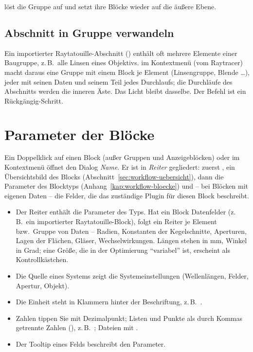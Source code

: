  löst die Gruppe auf und setzt ihre Blöcke wieder auf die äußere Ebene.

\subsection{Abschnitt in Gruppe verwandeln}

Ein importierter Raytatouille-Abschnitt () enthält oft mehrere Elemente einer
Baugruppe, z.\,B.\ alle Linsen eines Objektivs.  im Kontextmenü (vom
Raytracer) macht daraus eine Gruppe mit einem Block je Element (Linsengruppe, Blende …), jeder
mit seinen Daten und seinem Teil jedes Durchlaufs; die Durchläufe des Abschnitts werden die inneren
Äste. Das Licht bleibt dasselbe. Der Befehl ist ein Rückgängig-Schritt.

\section{Parameter der Blöcke}\label{sec:workflow-parameter}

Ein Doppelklick auf einen Block (außer Gruppen und Anzeigeblöcken) oder  im
Kontextmenü öffnet den Dialog  \textit{Name}. Er ist in \emph{Reiter}
gegliedert: zuerst , ein Übersichtsbild des Blocks
(Abschnitt~\ref{sec:workflow-uebersicht}), dann die Parameter des Blocktyps
(Anhang~\ref{kap:workflow-bloecke}) und – bei Blöcken mit eigenen Daten – die Felder, die das
zuständige Plugin für diesen Block beschreibt.

\begin{itemize}
  \item Der Reiter  enthält die Parameter des Typs. Hat ein Block Datenfelder
        (z.\,B.\ ein importierter Raytatouille-Block), folgt ein Reiter
        je Element bzw.\ Gruppe von Daten – Radien, Konstanten der Kegelschnitte, Aperturen,
        Lagen der Flächen, Gläser, Wechselwirkungen. Längen stehen in mm, Winkel in Grad; eine
        Größe, die in der Optimierung \enquote{variabel} ist, erscheint als Kontrollkästchen.
  \item Die Quelle eines Systems zeigt die Systemeinstellungen (Wellenlängen, Felder, Apertur,
        Objekt).
  \item Die Einheit steht in Klammern hinter der Beschriftung, z.\,B.\ .
  \item Zahlen tippen Sie mit Dezimalpunkt; Listen und Punkte als durch Kommas getrennte
        Zahlen (), z.\,B.\ ; Dateien mit .
  \item Der Tooltip eines Felds beschreibt den Parameter.
\end{itemize}

